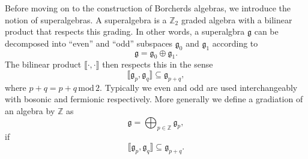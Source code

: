 Before moving on to the construction of Borcherds algebras, we introduce the notion of superalgebras. A superalgebra is a $\mathbb{Z}_2$ graded algebra with a bilinear product that respects this grading. In other words, a superalgbra $\mathfrak{g}$ can be decomposed into ``even'' and ``odd'' subspaces $\mathfrak{g}_0$ and $\mathfrak{g}_1$ according to 
\begin{equation}
    \mathfrak{g} = \mathfrak{g}_0\oplus\mathfrak{g}_1.
\end{equation}
The bilinear product $\llbracket\cdot,\cdot\rrbracket$ then respects this in the sense
\begin{equation}
    \llbracket\mathfrak{g}_p,\mathfrak{g}_q\rrbracket \subseteq \mathfrak{g}_{p+q},
\end{equation}
where $p+q = p+q\,\text{mod}\,2$. Typically we even and odd are used interchangeably with bosonic and fermionic respectively. More generally we define a gradiation of an algebra by $\mathbb{Z}$ as 
\begin{equation}
    \mathfrak{g} = \bigoplus_{p\in\mathbb{Z}} \mathfrak{g}_{p},
\end{equation}
if
\begin{equation}
    \llbracket \mathfrak{g}_p,\mathfrak{g}_q\rrbracket\subseteq \mathfrak{g}_{p+q}.
\end{equation}

